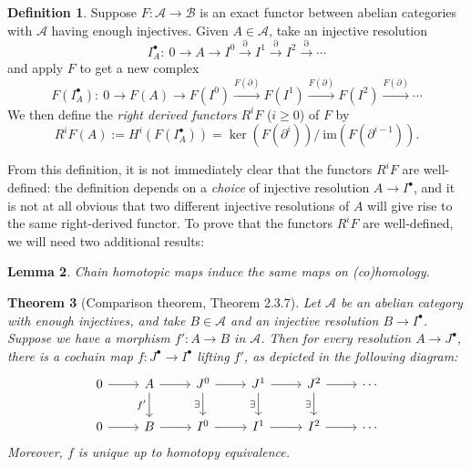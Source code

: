 \documentclass{article}
\def\~#1{\mathscr{#1}}
\def\To#1{\xrightarrow{#1}}
\numberwithin{equation}{section}
\numberwithin{figure}{section}
\newcommand{\im}{\mathrm{im}}
\renewcommand{\d}{\partial}
\newcommand{\Ch}{\mathrm{Ch}}
\theoremstyle{plain}
\newtheorem{thm}{Theorem}[section]
\newtheorem{lem}[thm]{Lemma}
\theoremstyle{definition}
\newtheorem{defn}[thm]{Definition}
\theoremstyle{remark}
\begin{document}
\begin{defn} 
Suppose $F: \~A \to \~B$ is an exact functor between abelian categories with $\~A$ having enough injectives. Given $A \in \~A$, take an injective resolution
\[I_A^\bullet : ~ 0 \to A \to I^0 \To{\d} I^1 \To{\d} I^2 \To{\d} \cdots\]
and apply $F$ to get a new complex
\[F(I_A^\bullet) : ~ 0 \to F(A) \to F(I^0) \To{F(\d)} F(I^1) \To{F(\d)} F(I^2) \To{F(\d)} \cdots\]
We then define the \emph{right derived functors} $R^i F$ ($i \ge 0$) of $F$ by 
\begin{equation}R^iF(A) := H^i(F(I_A^\bullet)) = \ker\left(F\left(\d^i\right)\right)/~\im\left(F(\d^{i-1})\right).\end{equation}
\end{defn}
From this definition, it is not immediately clear that the functors $R^iF$ are well-defined: the definition depends on a \emph{choice} of injective resolution $A \to I^\bullet$, and it is not at all obvious that two different injective resolutions of $A$ will give rise to the same right-derived functor. To prove that the functors $R^iF$ are well-defined, we will need two additional results:
\begin{lem}\label{lem:chain_homotopy_lem}
    Chain homotopic maps induce the same maps on (co)homology.
\end{lem}
\begin{thm}[Comparison theorem, \cite{weibel} Theorem 2.3.7]\label{thm:comparison}
     Let $\~A$ be an abelian category with enough injectives, and take $B \in \~A$ and an injective resolution $B \to I^\bullet$. Suppose we have a morphism $f': A \to B$ in $\~A$. Then for every resolution $A \to J^\bullet$, there is a cochain map $f: J^\bullet \to I^\bullet$ lifting $f'$, as depicted in the following diagram:
     \[\begin{tikzcd}
    0 & A & {J^0} & {J^1} & {J^2} & \cdots \\
    0 & B & {I^0} & {I^1} & {I^2} & \cdots
    \arrow[from=1-1, to=1-2]
    \arrow[from=1-2, to=1-3]
    \arrow["{f'}"', from=1-2, to=2-2]
    \arrow[from=1-3, to=1-4]
    \arrow["\exists"', from=1-3, to=2-3]
    \arrow[from=1-4, to=1-5]
    \arrow["\exists"', from=1-4, to=2-4]
    \arrow[from=1-5, to=1-6]
    \arrow["\exists"', from=1-5, to=2-5]
    \arrow[from=2-1, to=2-2]
    \arrow[from=2-2, to=2-3]
    \arrow[from=2-3, to=2-4]
    \arrow[from=2-4, to=2-5]
    \arrow[from=2-5, to=2-6]
\end{tikzcd}\]
Moreover, $f$ is unique up to homotopy equivalence.
\end{thm}
\end{document}

